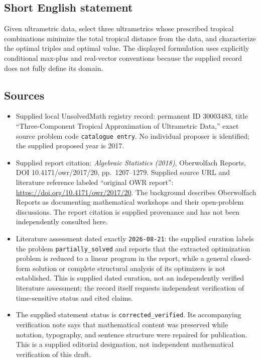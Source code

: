 \documentclass[11pt]{article}
\begin{document}
\subsection{Short English statement}
Given ultrametric data, select three ultrametrics whose prescribed tropical combinations minimize the total tropical distance from the data, and characterize the optimal triples and optimal value. The displayed formulation uses explicitly conditional max-plus and real-vector conventions because the supplied record does not fully define its domain.
\subsection{Sources}
\begin{itemize}
\item Supplied local UnsolvedMath registry record: permanent ID \(30003483\), title ``Three-Component Tropical Approximation of Ultrametric Data,'' exact source problem code \texttt{catalogue entry}. No individual proposer is identified; the supplied proposed year is 2017.
\item Supplied report citation: \emph{Algebraic Statistics (2018)}, Oberwolfach Reports, DOI 10.4171/owr/2017/20, pp.\ 1207--1279. Supplied source URL and literature reference labeled ``original OWR report'': \url{https://doi.org/10.4171/owr/2017/20}. The background describes Oberwolfach Reports as documenting mathematical workshops and their open-problem discussions. The report citation is supplied provenance and has not been independently consulted here.
\item Literature assessment dated exactly \texttt{2026-08-21}: the supplied curation labels the problem \texttt{partially\_solved} and reports that the extracted optimization problem is reduced to a linear program in the report, while a general closed-form solution or complete structural analysis of its optimizers is not established. This is supplied dated curation, not an independently verified literature assessment; the record itself requests independent verification of time-sensitive status and cited claims.
\item The supplied statement status is \texttt{corrected\_verified}. Its accompanying verification note says that mathematical content was preserved while notation, typography, and sentence structure were repaired for publication. This is a supplied editorial designation, not independent mathematical verification of this draft.
\end{itemize}
\end{document}
